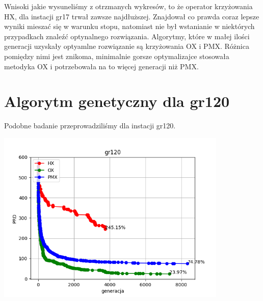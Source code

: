 \documentclass{article}
\begin{document}
    Wnisoki jakie wysuneliśmy z otrzmanych wykresów, to że operator krzyżowania HX,
    dla instacji gr17 trwał zawsze najdłuższej. Znajdował co prawda coraz lepsze wyniki mieszać się 
    w warunku stopu, natomiast nie był wstanianie w niektórych przypadkach znaleźć optynalnego rozwiązania.
    Algorytmy, które w małej ilości generacji uzyskały optyamlne rozwiązanie są 
    krzyżowania OX i PMX. Różnica pomiędzy nimi jest znikoma, minimalnie gorsze optymalizajce
    stosowała metodyka OX i potrzebowała na to więcej generacji niż PMX.

    \section{Algorytm genetyczny dla gr120}

    Podobne badanie przeprowadziliśmy dla instacji gr120. 

    \includegraphics[width=11cm]{../spr3img/grX/Figure_1gr120.png}
\end{document}
